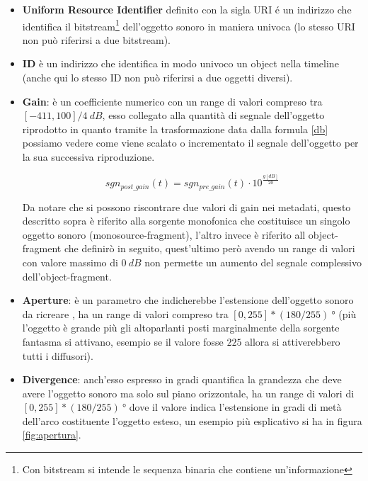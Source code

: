 \documentclass[12pt,a4paper]{report}
\begin{document}
\begin{itemize}
\item \textbf{Uniform Resource Identifier}\cite{uri} definito con la sigla URI é un indirizzo che identifica il bitstream\footnote{Con bitstream si intende le sequenza binaria che contiene un'informazione} dell'oggetto sonoro in maniera univoca (lo stesso URI non può riferirsi a due bitstream).

\item \textbf{ID} è un indirizzo che identifica in modo univoco un object nella timeline (anche qui lo stesso ID non può riferirsi a due oggetti diversi).

\item \textbf{Gain}: è un coefficiente numerico con un range di valori compreso tra $[-411,100]/4 \ dB$, esso  collegato alla quantità di segnale dell'oggetto riprodotto in quanto tramite la trasformazione data dalla formula \ref{db} possiamo vedere come viene scalato o incrementato il segnale dell'oggetto per la sua successiva riproduzione.

\begin{equation}
sgn_{post\_gain}(t)= sgn_{pre\_gain}(t) \cdot 10^{\frac{g[dB]}{20}}
\label{db}
\end{equation}

Da notare che si possono riscontrare due valori di gain nei metadati, questo descritto sopra è riferito alla sorgente monofonica che costituisce un singolo oggetto sonoro (monosource-fragment), l'altro invece è riferito all object-fragment che definirò in seguito, quest'ultimo però avendo un range di valori con valore massimo di $0\ dB$ non permette un aumento del segnale complessivo dell'object-fragment.
 
\item \textbf{Aperture}: è un parametro che indicherebbe l'estensione dell'oggetto sonoro da ricreare , ha un range di valori compreso tra $[0,255]*(180/255)\ °$ (più l'oggetto è grande più gli altoparlanti posti marginalmente della sorgente fantasma si attivano, esempio se il valore fosse $225$ allora si attiverebbero tutti i diffusori). 

\item \textbf{Divergence}: anch'esso espresso in gradi quantifica la grandezza che deve avere l'oggetto sonoro ma solo sul piano orizzontale, ha un range di valori di $[0,255]*(180/255)\ °$ dove il valore indica l'estensione in gradi di metà dell'arco costituente l'oggetto esteso, un esempio più esplicativo si ha in figura \ref{fig:apertura}.


\end{itemize}
\end{document}
